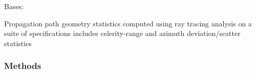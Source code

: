\documentclass[letterpaper,10pt,english]{sphinxmanual}
\begin{document}
\begin{fulllineitems}
\label{\detokenize{stochprop.propagation:stochprop.propagation.PathGeometryModel}}
Bases: 

Propagation path geometry statistics computed using ray tracing
analysis on a suite of specifications includes celerity-range and
azimuth deviation/scatter statistics
\subsubsection*{Methods}


\begin{savenotes}\sphinxatlongtablestart\begin{longtable}[c]{}
\hline

\endfirsthead

%
{}\\
\hline

\endhead

\hline
{}\\
\endfoot

\endlastfoot


\end{longtable}
\end{savenotes}
\end{fulllineitems}
\end{document}
